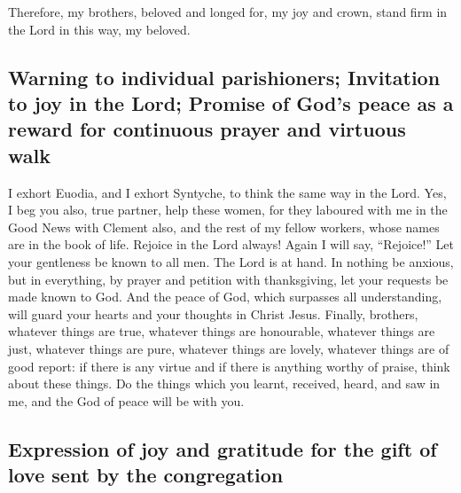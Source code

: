  Therefore, my brothers, beloved and longed for, my joy
and crown, stand firm in the Lord in this way, my beloved.

\hypertarget{warning-to-individual-parishioners-invitation-to-joy-in-the-lord-promise-of-gods-peace-as-a-reward-for-continuous-prayer-and-virtuous-walk}{%
\subsection{Warning to individual parishioners; Invitation to joy in the
Lord; Promise of God's peace as a reward for continuous prayer and
virtuous
walk}\label{warning-to-individual-parishioners-invitation-to-joy-in-the-lord-promise-of-gods-peace-as-a-reward-for-continuous-prayer-and-virtuous-walk}}

 I exhort Euodia, and I exhort Syntyche, to think the same
way in the Lord.  Yes, I beg you also, true partner, help
these women, for they laboured with me in the Good News with Clement
also, and the rest of my fellow workers, whose names are in the book of
life.  Rejoice in the Lord always! Again I will say,
``Rejoice!''  Let your gentleness be known to all men. The
Lord is at hand.  In nothing be anxious, but in
everything, by prayer and petition with thanksgiving, let your requests
be made known to God.  And the peace of God, which
surpasses all understanding, will guard your hearts and your thoughts in
Christ Jesus.  Finally, brothers, whatever things are
true, whatever things are honourable, whatever things are just, whatever
things are pure, whatever things are lovely, whatever things are of good
report: if there is any virtue and if there is anything worthy of
praise, think about these things.  Do the things which you
learnt, received, heard, and saw in me, and the God of peace will be
with you.

\hypertarget{expression-of-joy-and-gratitude-for-the-gift-of-love-sent-by-the-congregation}{%
\subsection{Expression of joy and gratitude for the gift of love sent by
the
congregation}\label{expression-of-joy-and-gratitude-for-the-gift-of-love-sent-by-the-congregation}}

